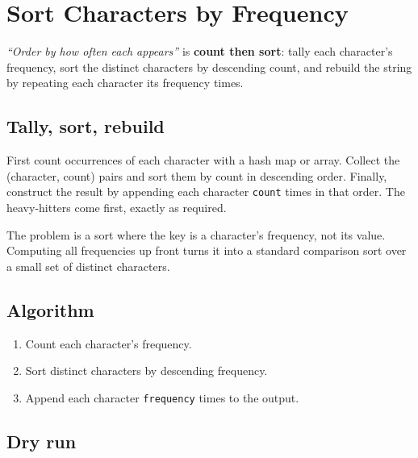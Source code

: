 \section{Sort Characters by Frequency}
\label{sec:str-sort-by-frequency}


\begin{patternbox}
\emph{``Order by how often each appears''} is \textbf{count then sort}: tally
each character's frequency, sort the distinct characters by descending
count, and rebuild the string by repeating each character its frequency
times.
\end{patternbox}

\subsection*{Tally, sort, rebuild}

First count occurrences of each character with a hash map or array. Collect
the (character, count) pairs and sort them by count in descending order.
Finally, construct the result by appending each character \texttt{count}
times in that order. The heavy-hitters come first, exactly as required.

\begin{ideabox}
The problem is a sort where the key is a character's frequency, not its
value. Computing all frequencies up front turns it into a standard
comparison sort over a small set of distinct characters.
\end{ideabox}

\subsection*{Algorithm}

\begin{enumerate}
  \item Count each character's frequency.
  \item Sort distinct characters by descending frequency.
  \item Append each character \texttt{frequency} times to the output.
\end{enumerate}

\subsection*{Dry run}

